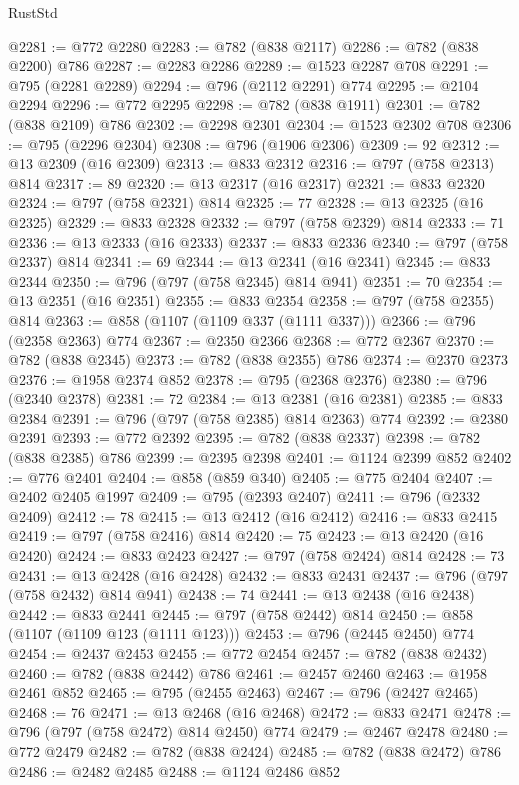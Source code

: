 \begin{lexlean}{RustStd}
\begin{coremodule}
{\begin{coremodule}
{{{{{{{{{{{{{{@2281 := @772 @2280
@2283 := @782 (@838 @2117)
@2286 := @782 (@838 @2200) @786
@2287 := @2283 @2286
@2289 := @1523 @2287 @708
@2291 := @795 (@2281 @2289)
@2294 := @796 (@2112 @2291) @774
@2295 := @2104 @2294
@2296 := @772 @2295
@2298 := @782 (@838 @1911)
@2301 := @782 (@838 @2109) @786
@2302 := @2298 @2301
@2304 := @1523 @2302 @708
@2306 := @795 (@2296 @2304)
@2308 := @796 (@1906 @2306)
@2309 := 92
@2312 := @13 @2309 (@16 @2309)
@2313 := @833 @2312
@2316 := @797 (@758 @2313) @814
@2317 := 89
@2320 := @13 @2317 (@16 @2317)
@2321 := @833 @2320
@2324 := @797 (@758 @2321) @814
@2325 := 77
@2328 := @13 @2325 (@16 @2325)
@2329 := @833 @2328
@2332 := @797 (@758 @2329) @814
@2333 := 71
@2336 := @13 @2333 (@16 @2333)
@2337 := @833 @2336
@2340 := @797 (@758 @2337) @814
@2341 := 69
@2344 := @13 @2341 (@16 @2341)
@2345 := @833 @2344
@2350 := @796 (@797 (@758 @2345) @814 @941)
@2351 := 70
@2354 := @13 @2351 (@16 @2351)
@2355 := @833 @2354
@2358 := @797 (@758 @2355) @814
@2363 := @858 (@1107 (@1109 @337 (@1111 @337)))
@2366 := @796 (@2358 @2363) @774
@2367 := @2350 @2366
@2368 := @772 @2367
@2370 := @782 (@838 @2345)
@2373 := @782 (@838 @2355) @786
@2374 := @2370 @2373
@2376 := @1958 @2374 @852
@2378 := @795 (@2368 @2376)
@2380 := @796 (@2340 @2378)
@2381 := 72
@2384 := @13 @2381 (@16 @2381)
@2385 := @833 @2384
@2391 := @796 (@797 (@758 @2385) @814 @2363) @774
@2392 := @2380 @2391
@2393 := @772 @2392
@2395 := @782 (@838 @2337)
@2398 := @782 (@838 @2385) @786
@2399 := @2395 @2398
@2401 := @1124 @2399 @852
@2402 := @776 @2401
@2404 := @858 (@859 @340)
@2405 := @775 @2404
@2407 := @2402 @2405 @1997
@2409 := @795 (@2393 @2407)
@2411 := @796 (@2332 @2409)
@2412 := 78
@2415 := @13 @2412 (@16 @2412)
@2416 := @833 @2415
@2419 := @797 (@758 @2416) @814
@2420 := 75
@2423 := @13 @2420 (@16 @2420)
@2424 := @833 @2423
@2427 := @797 (@758 @2424) @814
@2428 := 73
@2431 := @13 @2428 (@16 @2428)
@2432 := @833 @2431
@2437 := @796 (@797 (@758 @2432) @814 @941)
@2438 := 74
@2441 := @13 @2438 (@16 @2438)
@2442 := @833 @2441
@2445 := @797 (@758 @2442) @814
@2450 := @858 (@1107 (@1109 @123 (@1111 @123)))
@2453 := @796 (@2445 @2450) @774
@2454 := @2437 @2453
@2455 := @772 @2454
@2457 := @782 (@838 @2432)
@2460 := @782 (@838 @2442) @786
@2461 := @2457 @2460
@2463 := @1958 @2461 @852
@2465 := @795 (@2455 @2463)
@2467 := @796 (@2427 @2465)
@2468 := 76
@2471 := @13 @2468 (@16 @2468)
@2472 := @833 @2471
@2478 := @796 (@797 (@758 @2472) @814 @2450) @774
@2479 := @2467 @2478
@2480 := @772 @2479
@2482 := @782 (@838 @2424)
@2485 := @782 (@838 @2472) @786
@2486 := @2482 @2485
@2488 := @1124 @2486 @852
}}}}}}}}}}}}}}
\end{coremodule}}
\end{coremodule}
\end{lexlean}
